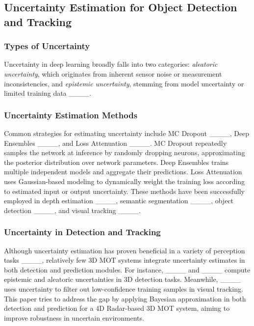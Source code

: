 \subsection{Uncertainty Estimation for Object Detection and Tracking}
\label{sec:sec2b}

\subsubsection{Types of Uncertainty}
Uncertainty in deep learning broadly falls into two categories: \emph{aleatoric uncertainty}, which originates from inherent sensor noise or measurement inconsistencies, and \emph{epistemic uncertainty}, stemming from model uncertainty or limited training data ____.

\subsubsection{Uncertainty Estimation Methods}
Common strategies for estimating uncertainty include MC Dropout ____, Deep Ensembles ____, and Loss Attenuation ____. 
MC Dropout repeatedly samples the network at inference by randomly dropping neurons, approximating the posterior distribution over network parameters. Deep Ensembles trains multiple independent models and aggregate their predictions. Loss Attenuation uses Gaussian-based modeling to dynamically weight the training loss according to estimated input or output uncertainty. These methods have been successfully employed in depth estimation ____, semantic segmentation ____, object detection ____, and visual tracking ____.

\subsubsection{Uncertainty in Detection and Tracking}
Although uncertainty estimation has proven beneficial in a variety of perception tasks ____, relatively few 3D MOT systems integrate uncertainty estimates in both detection and prediction modules. For instance, ____ and ____ compute epistemic and aleatoric uncertainties in 3D detection tasks. Meanwhile, ____ uses uncertainty to filter out low-confidence training samples in visual tracking. This paper tries to address the gap by applying Bayesian approximation in both detection and prediction for a 4D Radar-based 3D MOT system, aiming to improve robustness in uncertain environments.